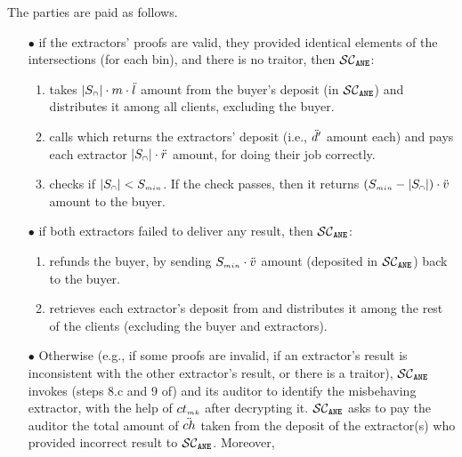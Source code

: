 



\item The parties are paid as follows. 

\begin{itemize}
%
\item[$\bullet$]  if the extractors' proofs are valid, they provided identical elements of the intersections (for each bin), and there is no traitor, then $\mathcal{SC}_{\mathtt{ANE}}$:
\begin{enumerate}
%
 \item takes $|S_{\scriptscriptstyle\cap}|\cdot m\cdot \ddot{l}$ amount from the buyer's deposit (in $\mathcal{SC}_{\mathtt{ANE}}$) and distributes it among all clients, excluding the buyer. 
 \item calls \SCpc which returns the extractors' deposit (i.e., $\ddot{d}'$ amount each) and pays each extractor $|S_{\scriptscriptstyle\cap}|\cdot \ddot{r}$ amount, for doing their job correctly. 
 \item checks if $|{ { {S}}}_{\scriptscriptstyle\cap}|<S_{\scriptscriptstyle min}$. If the check passes, then it returns $(S_{\scriptscriptstyle min}-|S_{\scriptscriptstyle\cap}|)\cdot \ddot{v}$ amount  to the buyer.
 \end{enumerate}
% 
\item[$\bullet$] if both extractors failed to deliver any result, then $\mathcal{SC}_{\mathtt{ANE}}$:
%
\begin{enumerate}
%
\item refunds the buyer, by sending $S_{\scriptscriptstyle min}\cdot \ddot{v}$ amount (deposited in $\mathcal{SC}_{\mathtt{ANE}}$) back to the buyer. 
%
\item retrieves each extractor's deposit from \SCpc and distributes it among the rest of the clients (excluding the buyer and extractors).  
%
 \end{enumerate}
 \item[$\bullet$]\label{smart-PSI-inconsistency} Otherwise (e.g., if some proofs are invalid, if an extractor's result is inconsistent with the other extractor's result, or there is a traitor), $\mathcal{SC}_{\mathtt{ANE}}$ invokes (steps 8.c and 9 of) \SCpc and its auditor to identify the misbehaving extractor, with the help of $ct_{\scriptscriptstyle mk}$ after decrypting it. $\mathcal{SC}_{\mathtt{ANE}}$ asks \SCpc to pay the auditor the total amount of $\ddot{ch}$ taken from the deposit of the extractor(s) who provided incorrect result to $\mathcal{SC}_{\mathtt{ANE}}$. Moreover,
%


\end{itemize}
